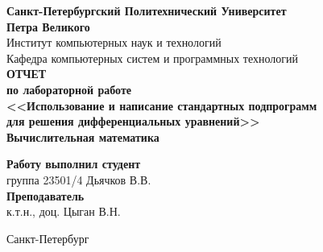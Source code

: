 \begin{titlepage}
\begin{center}
	\textbf{Санкт-Петербургский Политехнический Университет \\Петра Великого}\\[0.3cm]
	\small Институт компьютерных наук и технологий \\[0.3cm]
	\small Кафедра компьютерных систем и программных технологий\\[4cm]
	
	\textbf{ОТЧЕТ}\\ \textbf{по лабораторной работе}\\[0.5cm]
	\textbf{<<Использование и написание стандартных подпрограмм\\ для решения дифференциальных уравнений>>}\\[0.1cm]
	\textbf{Вычислительная математика}\\[8.0cm]
\end{center}

\begin{flushright}
	\begin{minipage}{0.48\textwidth}
		\begin{flushleft}
			\small \textbf{Работу выполнил студент}\\[3mm]
			\small группа 23501/4 \hspace*{6mm} Дьячков В.В.\\[5mm]
			
			\small \textbf{Преподаватель}\\[5mm]
		 	\small \sign[3cm] \hspace*{5mm} к.т.н., доц. Цыган В.Н.\\[0.5cm]
		\end{flushleft}
	\end{minipage}
\end{flushright}

\vfill

\begin{center}
	\small Санкт-Петербург\\
	\small \the\year
\end{center}
\end{titlepage}